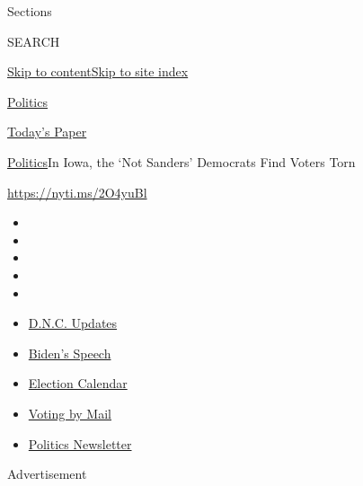 Sections

SEARCH

\protect\hyperlink{site-content}{Skip to
content}\protect\hyperlink{site-index}{Skip to site index}

\href{https://www.nytimes3xbfgragh.onion/section/politics}{Politics}

\href{https://myaccount.nytimes3xbfgragh.onion/auth/login?response_type=cookie\&client_id=vi}{}

\href{https://www.nytimes3xbfgragh.onion/section/todayspaper}{Today's
Paper}

\href{/section/politics}{Politics}\textbar{}In Iowa, the `Not Sanders'
Democrats Find Voters Torn

\url{https://nyti.ms/2O4yuBl}

\begin{itemize}
\item
\item
\item
\item
\item
\end{itemize}

\begin{itemize}
\item
  \href{https://www.nytimes3xbfgragh.onion/live/2020/08/20/us/dnc-convention-election?action=click\&pgtype=Article\&state=default\&region=TOP_BANNER\&context=storylines_menu}{D.N.C.
  Updates}
\item
  \href{https://www.nytimes3xbfgragh.onion/2020/08/20/us/politics/biden-presidential-nomination-dnc.html?action=click\&pgtype=Article\&state=default\&region=TOP_BANNER\&context=storylines_menu}{Biden's
  Speech}
\item
  \href{https://www.nytimes3xbfgragh.onion/interactive/2019/us/elections/2020-presidential-election-calendar.html?action=click\&pgtype=Article\&state=default\&region=TOP_BANNER\&context=storylines_menu}{Election
  Calendar}
\item
  \href{https://www.nytimes3xbfgragh.onion/interactive/2020/08/11/us/politics/vote-by-mail-us-states.html?action=click\&pgtype=Article\&state=default\&region=TOP_BANNER\&context=storylines_menu}{Voting
  by Mail}
\item
  \href{https://www.nytimes3xbfgragh.onion/newsletters/politics?action=click\&pgtype=Article\&state=default\&region=TOP_BANNER\&context=storylines_menu}{Politics
  Newsletter}
\end{itemize}

Advertisement

